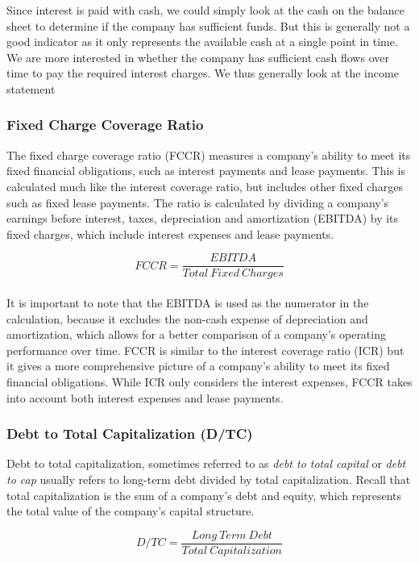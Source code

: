 \documentclass{article}
\begin{document}
Since interest is paid with cash, we could simply look at the cash on the balance sheet to determine if the company has sufficient funds. But this is generally not a good indicator as it only represents the available cash at a single point in time. We are more interested in whether the company has sufficient cash flows over time to pay the required interest charges. We thus generally look at the income statement


\subsubsection{Fixed Charge Coverage Ratio}
The fixed charge coverage ratio (FCCR) measures a company's ability to meet its fixed financial obligations, such as interest payments and lease payments. This is calculated much like the interest coverage ratio, but includes other fixed charges such as fixed lease payments. The ratio is calculated by dividing a company's earnings before interest, taxes, depreciation and amortization (EBITDA) by its fixed charges, which include interest expenses and lease payments.

 \begin{equation}
    FCCR = \frac{EBITDA}{Total\: Fixed\: Charges}
\end{equation}\\

It is important to note that the EBITDA is used as the numerator in the calculation, because it excludes the non-cash expense of depreciation and amortization, which allows for a better comparison of a company's operating performance over time. FCCR is similar to the interest coverage ratio (ICR) but it gives a more comprehensive picture of a company's ability to meet its fixed financial obligations. While ICR only considers the interest expenses, FCCR takes into account both interest expenses and lease payments.


\subsubsection{Debt to Total Capitalization (D/TC)}
Debt to total capitalization, sometimes referred to as \textit{debt to total capital} or \textit{debt to cap} usually refers to long-term debt divided by total capitalization. Recall that total capitalization is the sum of a company's debt and equity, which represents the total value of the company's capital structure.

 \begin{equation}
    D/TC = \frac{Long\: Term\: Debt}{Total\: Capitalization}
\end{equation}\\
\end{document}
